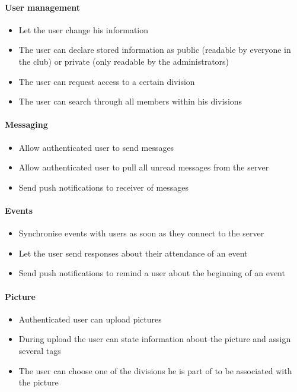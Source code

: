\paragraph{User management}
\begin{itemize}
\item Let the user change his information
\item The user can declare stored information as public (readable by everyone in the club) or private (only readable by the administrators)
\item The user can request access to a certain division
\item The user can search through all members within his divisions
\end{itemize}

\paragraph{Messaging}
\begin{itemize}
\item Allow authenticated user to send messages
\item Allow authenticated user to pull all unread messages from the server
\item Send push notifications to receiver of messages
\end{itemize}

\paragraph{Events}
\begin{itemize}
\item Synchronise events with users as soon as they connect to the server
\item Let the user send responses about their attendance of an event
\item Send push notifications to remind a user about the beginning of an event
\end{itemize}

\paragraph{Picture}
\begin{itemize}
\item Authenticated user can upload pictures
\item During upload the user can state information about the picture and assign several tags
\item The user can choose one of the divisions he is part of to be associated with the picture
\end{itemize}

